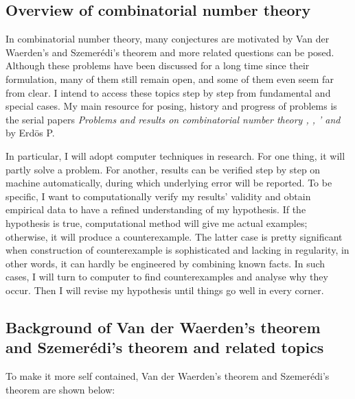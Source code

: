 \documentclass[12pt]{article}
\begin{document}
\subsection{Overview of combinatorial number theory}


In combinatorial number theory, many conjectures are motivated by Van der Waerden's and Szemer\'{e}di's theorem and more related questions can be posed. Although these problems have been discussed for a long time since their formulation, many of them still remain open, and some of them even seem far from clear. I intend to access these topics step by step from fundamental and special cases. My main resource for posing, history and progress of problems is the serial papers \textit{Problems and results on combinatorial number theory \uppercase\expandafter{}\cite{erdos1}, \uppercase\expandafter{}\cite{erdos2}, \uppercase\expandafter{}'\cite{erdos2_} and \uppercase\expandafter{}\cite{erdos3}} by Erd\"{o}s P.

In particular, I will adopt computer techniques in research. For one thing, it will partly solve a problem. For another, results can be verified step by step on machine automatically, during which underlying error will be reported. To be specific, I want to computationally verify my results' validity and obtain empirical data to have a refined understanding of my hypothesis. If the hypothesis is true, computational method will give me actual examples; otherwise, it will produce a counterexample. The latter case is pretty significant when construction of counterexample is sophisticated and lacking in regularity, in other words, it can hardly be engineered by combining known facts. In such cases, I will turn to computer to find counterexamples and analyse why they occur. Then I will revise my hypothesis until things go well in every corner.

\bigskip

\subsection{Background of Van der Waerden's theorem and Szemer\'{e}di's theorem and related topics}\label{backgnd}

To make it more self contained, Van der Waerden's theorem and Szemer\'{e}di's theorem are shown below:
\end{document}
